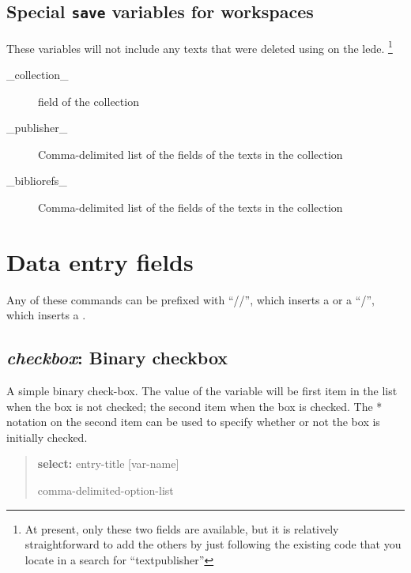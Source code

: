 \documentclass[letterpaper,10pt,english]{sphinxmanual}
\begin{document}
\subsection{Special \texttt{save} variables for workspaces}
\label{forms:special-save-variables-for-workspaces}
These variables will not include any texts that were deleted using
 on the lede. \footnote{
At present, only these two fields are available, but it is relatively
straightforward to add the others by just following the existing
code that you locate in a search for “textpublisher”
}
\begin{description}
\item[{\_collection\_}] \leavevmode
{} field of the collection

\item[{\_publisher\_}] \leavevmode
Comma-delimited list of the  fields of the texts in
the collection

\item[{\_bibliorefs\_}] \leavevmode
Comma-delimited list of the  fields of the texts in
the collection

\end{description}


\section{Data entry fields}
\label{forms:data-entry-fields}
Any of these commands can be prefixed with “//”, which inserts a 
or a “/”, which inserts a .


\subsection{\emph{checkbox}: Binary checkbox}
\label{forms:checkbox-binary-checkbox}
A simple binary check-box. The value of the variable will be first item
in the list when the box is not checked; the second item when the box is
checked. The * notation on the second item can be used to specify
whether or not the box is initially checked.
\begin{quote}

\begin{DUlineblock}{0em}
\item[] \textbf{select:} entry-title {[}var-name{]}
\item[] comma-delimited-option-list
\end{DUlineblock}
\end{quote}
\end{document}
